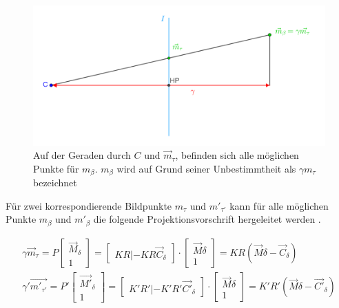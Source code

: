 \begin{figure}[!htb]
	\centering
	\includegraphics[width=0.8\linewidth]{images/gamma.png}
	\caption[Veranschaulichung der freien Variablen $\gamma$]{Auf der Geraden durch $C$ und $\vec{m}_\tau$, befinden sich alle möglichen Punkte für $m_\beta$. $m_\beta$ wird auf Grund seiner Unbestimmtheit als $\gamma m_\tau$ bezeichnet}  
	\label{fig:gamma}
\end{figure}


Für zwei korrespondierende Bildpunkte $m_\tau$ und $ m'_{\tau'}$ kann für alle möglichen Punkte $m_\beta$ und $m'_\beta$ die folgende Projektionsvorschrift hergeleitet werden \cite{Elements}.

\begin{gather}
	\gamma \vec{m}_\tau = P \begin{bmatrix}\vec{M}_\delta\\1\end{bmatrix} = 
	\begin{bmatrix}KR|-KR\vec{C}_\delta\end{bmatrix}\cdot \begin{bmatrix}\vec{M}\delta\\1\end{bmatrix} = KR(\vec{M}\delta - \vec{C}_\delta)\\
	\gamma' \vec{m'_{\tau'}} = P' \begin{bmatrix}\vec{M'}_\delta\\1\end{bmatrix} = 
	\begin{bmatrix}K'R'|-K'R'\vec{C'}_\delta\end{bmatrix}\cdot \begin{bmatrix}\vec{M}\delta\\1\end{bmatrix} = K'R'(\vec{M}\delta - \vec{C'}_\delta)\label{eq:Homo}
\end{gather}\\



